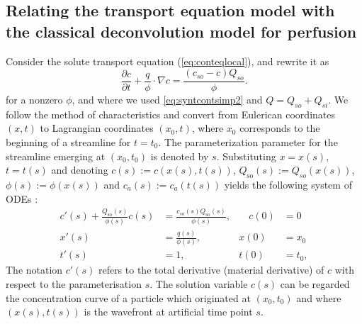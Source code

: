 \documentclass[paper=a4, fontsize=11pt,parskip=half,headings=small]{scrartcl}
\newcommand{\Qso}{Q_{\mathrm{so}}}
\begin{document}
\subsection{Relating the transport equation model with the classical deconvolution model for perfusion}
\label{sec:relating}
Consider the solute transport equation (\ref{eq:conteqlocal}), and rewrite it as
\begin{equation}
	\frac{\partial c}{\partial t} + \frac{q}{\phi} \cdot \nabla c = \frac{(c_{so}-c)Q_{so}}{\phi }.
	\label{eq:conteqlocal3}
\end{equation}
for a nonzero $\phi$, and where we used \eqref{eq:syntcontsimp2} and $Q = Q_{so} + Q_{si}$.
We follow the method of characteristics and convert from Eulerican coordinates $(x,t)$ to Lagrangian coordinates $(x_0,t)$, where $x_0$ corresponds to the beginning of a streamline for $t = t_0$. The parameterization parameter for the streamline emerging at $(x_0,t_0)$ is denoted by $s$. 
Substituting $x = x(s)$, $t=t(s)$ and denoting $c(s):=c(x(s),t(s))$, $\Qso(s):=Q_{so}(x(s))$, $\phi(s):=\phi(x(s))$ and $c_a(s):=c_a(t(s))$  yields the following system of ODEs \cite{evans98}:
\begin{subequations}
	\label{eq:ODEs}
	\begin{alignat}{2}
		c'(s) + \frac{\Qso(s)}{\phi(s)}c(s) &= \frac{c_{so}(s)\Qso(s)}{\phi(s)}, & \quad c(0) &= 0 \label{eq:ODEC} \\
		x'(s) &= \frac{q(s)}{\phi(s)}, &x(0) &= x_0 \label{eq:ODEx}\\
		t'(s) &= 1,     &t(0) &= t_0, \label{eq:ODEt}
	\end{alignat}
\end{subequations}
The notation $c'(s)$ refers to the total derivative (material derivative) of $c$ with respect to the parameterisation $s$.
The solution variable $c(s)$ can be regarded the concentration curve of a particle which originated at $(x_0,t_0)$ and where $(x(s),t(s))$ is the wavefront at artificial time point $s$. 
\end{document}
